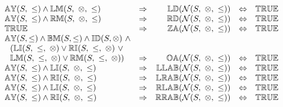 \[
\begin{array}{lcrcl} 
\propname{AY}(S,\ \leq) \wedge \propname{LM}(S,\ \otimes,\ \leq)
	& \Rightarrow
	& \propname{LD}(\mathcal{N}(S,\ \otimes,\ \leq)) 
    & \Leftrightarrow 
    & \propname{TRUE}
    \\ 
\propname{AY}(S,\ \leq) \wedge \propname{RM}(S,\ \otimes,\ \leq)
	& \Rightarrow
	& \propname{RD}(\mathcal{N}(S,\ \otimes,\ \leq)) 
    & \Leftrightarrow 
    & \propname{TRUE}
    \\ 
\propname{TRUE}
	& \Rightarrow
	& \propname{ZA}(\mathcal{N}(S,\ \otimes,\ \leq)) 
    & \Leftrightarrow 
    & \propname{TRUE}
    \\ 
\propname{AY}(S,\leq) \wedge \propname{BM}(S,\leq) \wedge \propname{ID}(S,\otimes) \ \wedge \\
\ \ (\propname{LI}(S,\ \leq,\ \otimes) \vee \propname{RI}(S,\ \leq,\ \otimes) \ \vee \\
\ \ \propname{LM}(S,\ \leq,\ \otimes) \vee \propname{RM}(S,\ \leq,\ \otimes))
	& \Rightarrow 
	& \propname{OA}(\mathcal{N}(S,\ \otimes,\ \leq)) 
    & \Leftrightarrow 
    & \propname{TRUE}
    \\ 
\propname{AY}(S,\ \leq) \wedge \propname{LI}(S,\ \otimes,\ \leq) 
	& \Rightarrow 
	& \propname{LLAB}(\mathcal{N}(S,\ \otimes,\ \leq)) 
    & \Leftrightarrow 
    & \propname{TRUE}
    \\ 
\propname{AY}(S,\ \leq) \wedge \propname{RI}(S,\ \otimes,\ \leq) 
	& \Rightarrow 
	& \propname{LRAB}(\mathcal{N}(S,\ \otimes,\ \leq)) 
    & \Leftrightarrow 
    & \propname{TRUE}
    \\
\propname{AY}(S,\ \leq) \wedge \propname{LI}(S,\ \otimes,\ \leq) 
	& \Rightarrow 
	& \propname{RLAB}(\mathcal{N}(S,\ \otimes,\ \leq)) 
    & \Leftrightarrow 
    & \propname{TRUE}
    \\ 
\propname{AY}(S,\ \leq) \wedge \propname{RI}(S,\ \otimes,\ \leq) 
	& \Rightarrow 
	& \propname{RRAB}(\mathcal{N}(S,\ \otimes,\ \leq)) 
    & \Leftrightarrow 
    & \propname{TRUE}
    \\
\end{array} 
\] 
